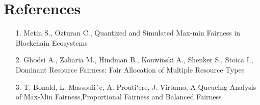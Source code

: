 \documentclass[a4paper,12pt]{report}
\begin{document}
\chapter{References}
\begin{itemize}
	\item[1.] Metin S., Ozturan C., Quantized and Simulated Max-min Fairness in Blockchain Ecosystems 
	
	\item[2.] Ghodsi A., Zaharia M., Hindman B., Konwinski A., Shenker S., Stoica I., Dominant Resource Fairness: Fair Allocation of Multiple Resource Types
	
	\item[3.] T. Bonald, L. Massouli´e, A. Prouti`ere, J. Virtamo, A Queueing Analysis of Max-Min Fairness,Proportional Fairness and Balanced Fairness
\end{itemize}
\end{document}
